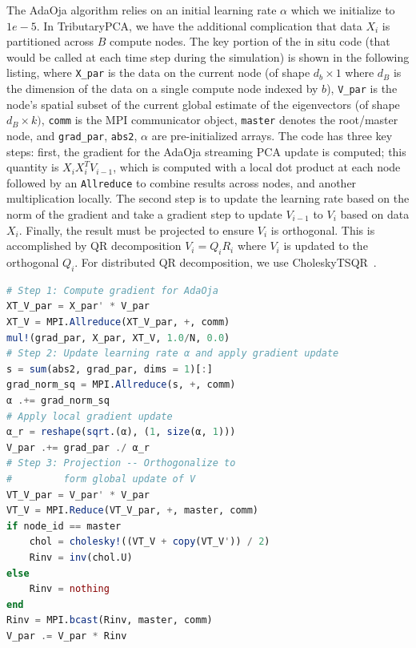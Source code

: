\documentclass{juliacon}
\begin{document}
The AdaOja algorithm relies on an initial learning rate $\alpha$ which we initialize to $1e-5$. In TributaryPCA, we have the additional complication that data $X_i$ is partitioned across $B$ compute nodes. 
The key portion of the in situ code (that would be called at each time step during the simulation) is shown in the following listing, where \texttt{X\_par} is the data on the current node (of shape $d_b \times 1$ where $d_B$ is the dimension of the data on a single compute node indexed by $b$), \texttt{V\_par} is the node's spatial subset of the current global estimate of the eigenvectors (of shape $d_B \times k)$, \texttt{comm} is the MPI communicator object, \texttt{master} denotes the root/master node, and \texttt{grad\_par}, \texttt{abs2}, $\alpha$ are pre-initialized arrays.
The code has three key steps: first, the gradient for the AdaOja streaming PCA update is computed; this quantity is $X_i X_i^T V_{i-1}$, which is computed with a local dot product at each node followed by an \texttt{Allreduce} to combine results across nodes, and another multiplication locally.
The second step is to update the learning rate based on the norm of the gradient and take a gradient step to update $V_{i-1}$ to $V_i$ based on data $X_i$.
Finally, the result must be projected to ensure $V_i$ is orthogonal.
This is accomplished by QR decomposition $V_i = Q_i R_i$ where $V_i$ is updated to the orthogonal $Q_i$. 
For distributed QR decomposition, we use CholeskyTSQR~\cite{demmel2012communication}.

\begin{minipage}{\linewidth}
\begin{lstlisting}[language = Julia, caption={Key algorithmic steps of TributaryPCA in Julia.}]
# Step 1: Compute gradient for AdaOja
XT_V_par = X_par' * V_par
XT_V = MPI.Allreduce(XT_V_par, +, comm)
mul!(grad_par, X_par, XT_V, 1.0/N, 0.0)
# Step 2: Update learning rate α and apply gradient update
s = sum(abs2, grad_par, dims = 1)[:]
grad_norm_sq = MPI.Allreduce(s, +, comm) 
α .+= grad_norm_sq 
# Apply local gradient update
α_r = reshape(sqrt.(α), (1, size(α, 1)))
V_par .+= grad_par ./ α_r
# Step 3: Projection -- Orthogonalize to 
#         form global update of V
VT_V_par = V_par' * V_par
VT_V = MPI.Reduce(VT_V_par, +, master, comm)
if node_id == master
    chol = cholesky!((VT_V + copy(VT_V')) / 2)
    Rinv = inv(chol.U)
else
    Rinv = nothing
end
Rinv = MPI.bcast(Rinv, master, comm)
V_par .= V_par * Rinv
\end{lstlisting}
\end{minipage}
\end{document}
